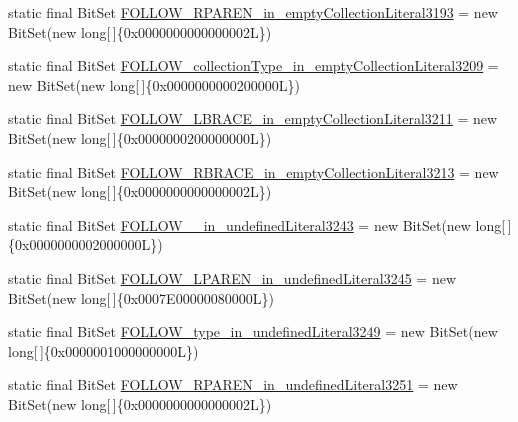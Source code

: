 \begin{DoxyCompactItemize}
\item 
static final Bit\-Set \hyperlink{classorg_1_1tzi_1_1use_1_1parser_1_1testsuite_1_1_test_suite_parser_aee21e357bda58f655fdb435bd92b7437}{F\-O\-L\-L\-O\-W\-\_\-\-R\-P\-A\-R\-E\-N\-\_\-in\-\_\-empty\-Collection\-Literal3193} = new Bit\-Set(new long\mbox{[}$\,$\mbox{]}\{0x0000000000000002\-L\})
\item 
static final Bit\-Set \hyperlink{classorg_1_1tzi_1_1use_1_1parser_1_1testsuite_1_1_test_suite_parser_a52888850e240abfa2a4b41230c138dd1}{F\-O\-L\-L\-O\-W\-\_\-collection\-Type\-\_\-in\-\_\-empty\-Collection\-Literal3209} = new Bit\-Set(new long\mbox{[}$\,$\mbox{]}\{0x0000000000200000\-L\})
\item 
static final Bit\-Set \hyperlink{classorg_1_1tzi_1_1use_1_1parser_1_1testsuite_1_1_test_suite_parser_a3960c828cd3fdd3d3fdc520e92e4b8a1}{F\-O\-L\-L\-O\-W\-\_\-\-L\-B\-R\-A\-C\-E\-\_\-in\-\_\-empty\-Collection\-Literal3211} = new Bit\-Set(new long\mbox{[}$\,$\mbox{]}\{0x0000000200000000\-L\})
\item 
static final Bit\-Set \hyperlink{classorg_1_1tzi_1_1use_1_1parser_1_1testsuite_1_1_test_suite_parser_a4406f2d0ab28f8d7da98f519ec338b2f}{F\-O\-L\-L\-O\-W\-\_\-\-R\-B\-R\-A\-C\-E\-\_\-in\-\_\-empty\-Collection\-Literal3213} = new Bit\-Set(new long\mbox{[}$\,$\mbox{]}\{0x0000000000000002\-L\})
\item 
static final Bit\-Set \hyperlink{classorg_1_1tzi_1_1use_1_1parser_1_1testsuite_1_1_test_suite_parser_aeeff9cc57e08ee4f25d9ad4a5048d402}{F\-O\-L\-L\-O\-W\-\_\-\_\-in\-\_\-undefined\-Literal3243} = new Bit\-Set(new long\mbox{[}$\,$\mbox{]}\{0x0000000002000000\-L\})
\item 
static final Bit\-Set \hyperlink{classorg_1_1tzi_1_1use_1_1parser_1_1testsuite_1_1_test_suite_parser_a4f1f127aadc8a41ba6c2732509e968be}{F\-O\-L\-L\-O\-W\-\_\-\-L\-P\-A\-R\-E\-N\-\_\-in\-\_\-undefined\-Literal3245} = new Bit\-Set(new long\mbox{[}$\,$\mbox{]}\{0x0007\-E00000080000\-L\})
\item 
static final Bit\-Set \hyperlink{classorg_1_1tzi_1_1use_1_1parser_1_1testsuite_1_1_test_suite_parser_ad8845e26f12160f55a5e67336a3958e4}{F\-O\-L\-L\-O\-W\-\_\-type\-\_\-in\-\_\-undefined\-Literal3249} = new Bit\-Set(new long\mbox{[}$\,$\mbox{]}\{0x0000001000000000\-L\})
\item 
static final Bit\-Set \hyperlink{classorg_1_1tzi_1_1use_1_1parser_1_1testsuite_1_1_test_suite_parser_abdee50ceb2f067d4286ac01aa943f70a}{F\-O\-L\-L\-O\-W\-\_\-\-R\-P\-A\-R\-E\-N\-\_\-in\-\_\-undefined\-Literal3251} = new Bit\-Set(new long\mbox{[}$\,$\mbox{]}\{0x0000000000000002\-L\})

\end{DoxyCompactItemize}
